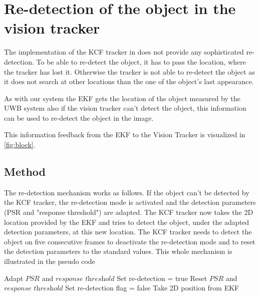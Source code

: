 
\chapter{Re-detection of the object in the vision tracker}\label{ch:redetecton}

The implementation of the \acf{KCF} tracker in \cite{Haag:2015} does not provide any sophisticated re-detection. To be able to re-detect the object, it has to pass the location, where the tracker has lost it. Otherwise the tracker is not able to re-detect the object as it does not search at other locations than the one of the object's last appearance.

As with our system the \acf{EKF} gets the location of the object measured by the \acf{UWB} system also if the vision tracker can't detect the object, this information can be used to re-detect the object in the image.

This information feedback from the \ac{EKF} to the Vision Tracker is visualized in \autoref{fig:block}.

\section{Method}
The re-detection mechanism works as follows. If the object can't be detected by the \ac{KCF} tracker, the re-detection mode is activated and the detection parameters (PSR and "response threshold") are adapted. The \ac{KCF} tracker now takes the 2D location provided by the \ac{EKF} and tries to detect the object, under the adapted detection parameters, at this new location. The \ac{KCF} tracker needs to detect the object on five consecutive frames to deactivate the re-detection mode and to reset the detection parameters to the standard values.
This whole mechanism is illustrated in the pseudo code %

\begin{algorithm}
	\begin{algorithmic}[1]
				\State Adapt $\textit{PSR}$ and $\textit{response threshold}$
				\State Set re-detection = true
			\Else
					\State Reset $\textit{PSR}$ and $\textit{response threshold}$
					\State Set re-detection flag = false
				\EndIf
			\EndIf
				\State Take 2D position from \ac{EKF}
			\EndIf
		\EndWhile
	\end{algorithmic}
	\label{lst:redetection}
\end{algorithm}

